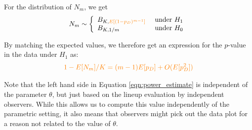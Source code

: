 \documentclass{article}
\newcommand{\hh}[1]{{\color{orange} #1}} %
\newtheorem{dfn}{Definition}[section]
\begin{document}
For the distribution of $N_m$, %
we get
\[
N_m\sim \left \{ 
\begin{array}{ll}
B_{K, \hh{E\left[ (1 - p_D)^{m-1}\right]}} & \text { under } H_1\\
B_{K, 1/m} & \text { under } H_0
\end{array}
\right .
\]

By matching the expected values, we therefore get an expression for the $p$-value in the data under $H_1$  as:
\begin{equation}\label{eqn:power_estimate}
\hh{1 - E[N_m]/K = (m-1)E[p_D] + O(E[p_D^2])}
\end{equation}

Note that the \hh{left}  hand side in Equation \ref{eqn:power_estimate} is independent of the parameter $\theta$, but just based on the lineup evaluation by independent observers. While this allows us to compute this value independently of the parametric setting, it also means that observers might pick out the data plot for a reason not related to the value of $\theta$. 


%
%
%



%
\end{document}
